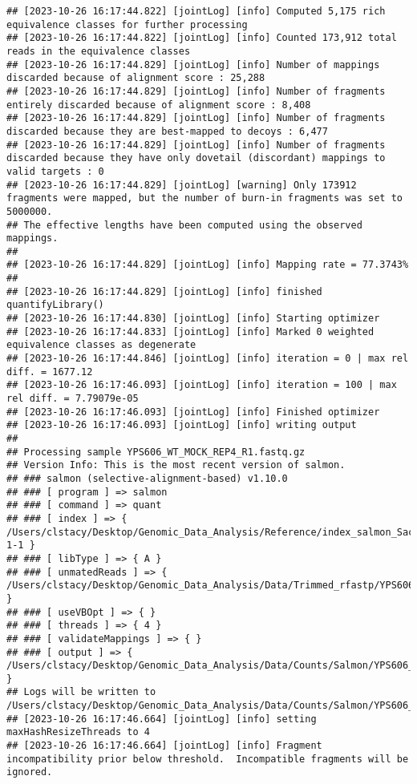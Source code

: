 \documentclass[
]{book}
\begin{document}
\begin{verbatim}
## [2023-10-26 16:17:44.822] [jointLog] [info] Computed 5,175 rich equivalence classes for further processing
## [2023-10-26 16:17:44.822] [jointLog] [info] Counted 173,912 total reads in the equivalence classes 
## [2023-10-26 16:17:44.829] [jointLog] [info] Number of mappings discarded because of alignment score : 25,288
## [2023-10-26 16:17:44.829] [jointLog] [info] Number of fragments entirely discarded because of alignment score : 8,408
## [2023-10-26 16:17:44.829] [jointLog] [info] Number of fragments discarded because they are best-mapped to decoys : 6,477
## [2023-10-26 16:17:44.829] [jointLog] [info] Number of fragments discarded because they have only dovetail (discordant) mappings to valid targets : 0
## [2023-10-26 16:17:44.829] [jointLog] [warning] Only 173912 fragments were mapped, but the number of burn-in fragments was set to 5000000.
## The effective lengths have been computed using the observed mappings.
## 
## [2023-10-26 16:17:44.829] [jointLog] [info] Mapping rate = 77.3743%
## 
## [2023-10-26 16:17:44.829] [jointLog] [info] finished quantifyLibrary()
## [2023-10-26 16:17:44.830] [jointLog] [info] Starting optimizer
## [2023-10-26 16:17:44.833] [jointLog] [info] Marked 0 weighted equivalence classes as degenerate
## [2023-10-26 16:17:44.846] [jointLog] [info] iteration = 0 | max rel diff. = 1677.12
## [2023-10-26 16:17:46.093] [jointLog] [info] iteration = 100 | max rel diff. = 7.79079e-05
## [2023-10-26 16:17:46.093] [jointLog] [info] Finished optimizer
## [2023-10-26 16:17:46.093] [jointLog] [info] writing output 
## 
## Processing sample YPS606_WT_MOCK_REP4_R1.fastq.gz
## Version Info: This is the most recent version of salmon.
## ### salmon (selective-alignment-based) v1.10.0
## ### [ program ] => salmon 
## ### [ command ] => quant 
## ### [ index ] => { /Users/clstacy/Desktop/Genomic_Data_Analysis/Reference/index_salmon_Saccharomyces_cerevisiae.R64-1-1 }
## ### [ libType ] => { A }
## ### [ unmatedReads ] => { /Users/clstacy/Desktop/Genomic_Data_Analysis/Data/Trimmed_rfastp/YPS606_WT_MOCK_REP4_R1.fastq.gz }
## ### [ useVBOpt ] => { }
## ### [ threads ] => { 4 }
## ### [ validateMappings ] => { }
## ### [ output ] => { /Users/clstacy/Desktop/Genomic_Data_Analysis/Data/Counts/Salmon/YPS606_WT_MOCK_REP4_R1.fastq.gz_quant }
## Logs will be written to /Users/clstacy/Desktop/Genomic_Data_Analysis/Data/Counts/Salmon/YPS606_WT_MOCK_REP4_R1.fastq.gz_quant/logs
## [2023-10-26 16:17:46.664] [jointLog] [info] setting maxHashResizeThreads to 4
## [2023-10-26 16:17:46.664] [jointLog] [info] Fragment incompatibility prior below threshold.  Incompatible fragments will be ignored.

\end{verbatim}
\end{document}
